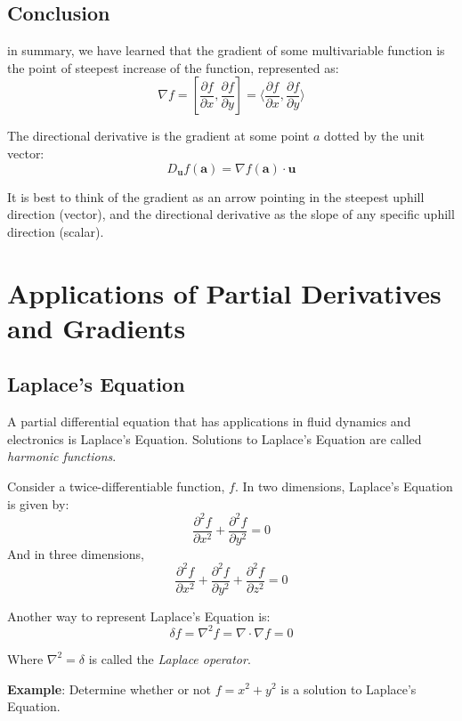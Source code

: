 \subsection{Conclusion}
in summary, we have learned that the gradient of some multivariable function is the point of steepest increase of the function, represented as:
$$\nabla f = \left[ \frac{\partial f}{\partial x}, \frac{\partial f}{
\partial y} \right] = \langle{ \frac{\partial f}{\partial x}, \frac{\partial f}{
\partial y} \rangle}$$

The directional derivative is the gradient at some point $a$ dotted by the unit vector:
$$
D_{\mathbf{u}} f(\mathbf{a}) = \nabla f(\mathbf{a}) \cdot \mathbf{u}
$$

It is best to think of the gradient as an arrow pointing in the steepest uphill direction (vector), and the directional derivative as the slope of any specific uphill direction (scalar). 


\section{Applications of Partial Derivatives and Gradients}

\subsection{Laplace's Equation}
A partial differential equation that has applications in fluid dynamics and 
electronics is Laplace's Equation. Solutions to 
Laplace's Equation are called \textit{harmonic functions}. 

\begin{mdframed}[style = important, frametitle = {Laplace's Equation}]
Consider a twice-differentiable function, $f$. In two dimensions, Laplace's 
Equation is given by:
$$ \frac{\partial ^2 f}{\partial x^2} + \frac{\partial^2 f}{\partial y^2} = 0$$
And in three dimensions, 
$$\frac{\partial ^2 f}{\partial x^2} + \frac{\partial ^2 f}{\partial y^2} + 
\frac{\partial ^2 f}{\partial z^2} = 0$$
\end{mdframed}

Another way to represent Laplace's Equation is:
$$\delta f = \nabla^2 f = \nabla \cdot \nabla f = 0$$

Where $\nabla ^2 = \delta$ is called the \textit{Laplace operator}. 

\textbf{Example}: Determine whether or not $f = x^2 + y^2$ is a solution to 
Laplace's Equation. 

